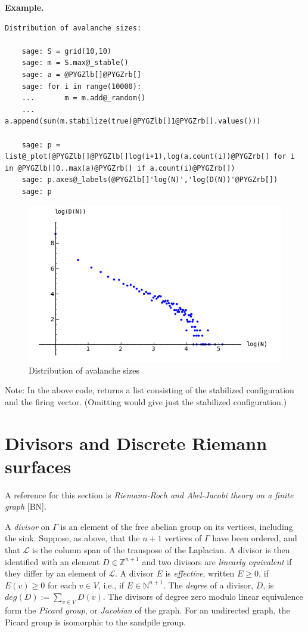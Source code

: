 \documentclass[letterpaper,10pt,english]{manual}
\begin{document}
\textbf{Example.}

\begin{Verbatim}[commandchars=@\[\]]
Distribution of avalanche sizes:

    sage: S = grid(10,10)
    sage: m = S.max@_stable()
    sage: a = @PYGZlb[]@PYGZrb[]
    sage: for i in range(10000):
    ...       m = m.add@_random()
    ...       a.append(sum(m.stabilize(true)@PYGZlb[]1@PYGZrb[].values()))

    sage: p = list@_plot(@PYGZlb[]@PYGZlb[]log(i+1),log(a.count(i))@PYGZrb[] for i in @PYGZlb[]0..max(a)@PYGZrb[] if a.count(i)@PYGZrb[])
    sage: p.axes@_labels(@PYGZlb[]'log(N)','log(D(N))'@PYGZrb[])
    sage: p
\end{Verbatim}
\begin{figure}[htbp]
\centering

\includegraphics{btw.png}
\caption{Distribution of avalanche sizes}\end{figure}

Note: In the above code,  returns a list consisting of the
stabilized configuration and the firing vector.  (Omitting  would give
just the stabilized configuration.)
\hypertarget{discrete-riemann-surfaces}{}

\section{Divisors and Discrete Riemann surfaces}

A reference for this section is \emph{Riemann-Roch and Abel-Jacobi theory on a finite
graph} {[}BN{]}.

A \emph{divisor} on $\Gamma$ is an element of the free abelian group on its
vertices, including the sink.  Suppose, as above, that the $n+1$ vertices of
$\Gamma$ have been ordered, and that $\mathcal{L}$ is the column span of the
transpose of the Laplacian.  A divisor is then identified with an element
$D\in\mathbb{Z}^{n+1}$ and two divisors are \emph{linearly equivalent} if they
differ by an element of $\mathcal{L}$.  A divisor $E$ is \emph{effective}, written
$E\geq0$, if $E(v)\geq0$ for each $v\in V$, i.e., if $E\in\mathbb{N}^{n+1}$.
The \emph{degree} of a divisor, $D$, is $deg(D) := \sum_{v\in V}D(v)$.   The
divisors of degree zero modulo linear equivalence form the \emph{Picard group}, or
\emph{Jacobian} of the graph. For an undirected graph, the Picard group is
isomorphic to the sandpile group.
\end{document}
